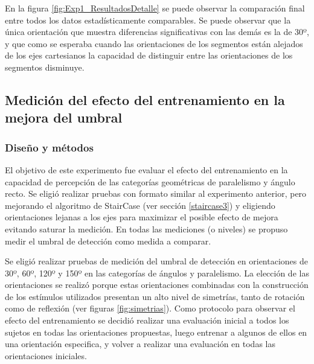 \documentclass{article}
\begin{document}
    En la figura \ref{fig:Exp1_ResultadosDetalle} se puede observar la comparación final entre todos los datos estadísticamente comparables. Se puede observar que la única orientación que muestra diferencias significativas con las demás es la de 30º, y que como se esperaba cuando las orientaciones de los segmentos están alejados de los ejes cartesianos la capacidad de distinguir entre las orientaciones de los segmentos disminuye. 
    
    
    \subsection{Medición del efecto del entrenamiento en la mejora del umbral}
    
    \subsubsection{Diseño y métodos}
    
    El objetivo de este experimento fue evaluar el efecto del entrenamiento en la capacidad de percepción de las categorías geométricas de paralelismo y ángulo recto. Se eligió realizar pruebas con formato similar al experimento anterior, pero mejorando el algoritmo de StairCase (ver sección \ref{staircase3}) y eligiendo orientaciones lejanas a los ejes para maximizar el posible efecto de mejora evitando saturar la medición. En todas las mediciones (o niveles) se propuso medir el umbral de detección como medida a comparar.
    
    Se eligió realizar pruebas de medición del umbral de detección en orientaciones de 30º, 60º, 120º y 150º en las categorías de ángulos y paralelismo. La elección de las orientaciones se realizó porque estas orientaciones combinadas con la construcción de los estímulos utilizados presentan un alto nivel de simetrías, tanto de rotación como de reflexión (ver figuras \ref{fig:simetrias}). Como protocolo para observar el efecto del entrenamiento se decidió realizar una evaluación inicial a todos los sujetos en todas las orientaciones propuestas, luego entrenar a algunos de ellos en una orientación especifica, y volver a realizar una evaluación en todas las orientaciones iniciales. 
    
\end{document}
